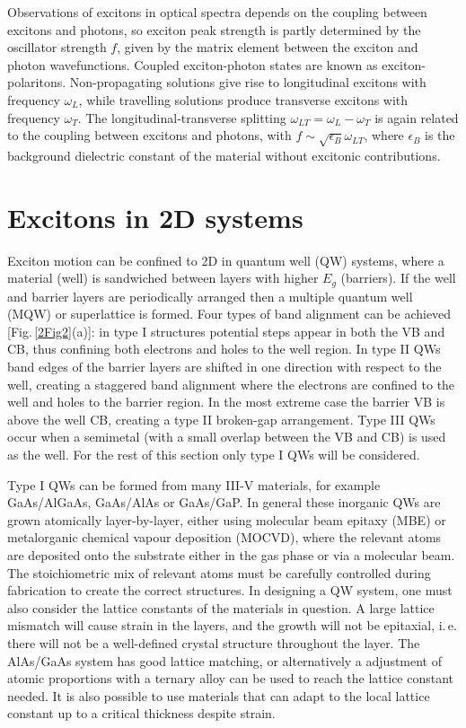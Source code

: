 Observations of excitons in optical spectra depends on the coupling between excitons and photons, so exciton peak strength is partly determined by the oscillator strength $f$, given by the matrix element between the exciton and photon wavefunctions. Coupled exciton-photon states are known as exciton-polaritons. Non-propagating solutions give rise to longitudinal excitons with frequency $\omega_L$, while travelling solutions produce transverse excitons with frequency $\omega_T$. The longitudinal-transverse splitting $\omega_{LT} = \omega_L - \omega_T$ is again related to the coupling between excitons and photons, with $f \sim \sqrt{\epsilon_B} \omega_{LT}$, where $\epsilon_B$ is the background dielectric constant of the material without excitonic contributions.

\section{Excitons in 2D systems}
Exciton motion can be confined to 2D in quantum well (QW) systems, where a material (well) is sandwiched between layers with higher $E_g$ (barriers). If the well and barrier layers are periodically arranged then a multiple quantum well (MQW) or superlattice is formed. Four types of band alignment can be achieved [Fig.\,\ref{2Fig2}(a)]: in type I structures potential steps appear in both the VB and CB, thus confining both electrons and holes to the well region. In type II QWs band edges of the barrier layers are shifted in one direction with respect to the well, creating a staggered band alignment where the electrons are confined to the well and holes to the barrier region. In the most extreme case the barrier VB is above the well CB, creating a type II broken-gap arrangement. Type III QWs occur when a semimetal (with a small overlap between the VB and CB) is used as the well. For the rest of this section only type I QWs will be considered.

Type I QWs can be formed from many III-V materials, for example GaAs/AlGaAs, GaAs/AlAs or GaAs/GaP. In general these inorganic QWs are grown atomically layer-by-layer, either using molecular beam epitaxy (MBE) or metalorganic chemical vapour deposition (MOCVD), where the relevant atoms are deposited onto the substrate either in the gas phase or via a molecular beam. The stoichiometric mix of relevant atoms must be carefully controlled during fabrication to create the correct structures. In designing a QW system, one must also consider the lattice constants of the materials in question. A large lattice mismatch will cause strain in the layers, and the growth will not be epitaxial, i.\,e.\,there will not be a well-defined crystal structure throughout the layer. The AlAs/GaAs system has good lattice matching, or alternatively a adjustment of atomic proportions with a ternary alloy can be used to reach the lattice constant needed. It is also possible to use materials that can adapt to the local lattice constant up to a critical thickness despite strain.

